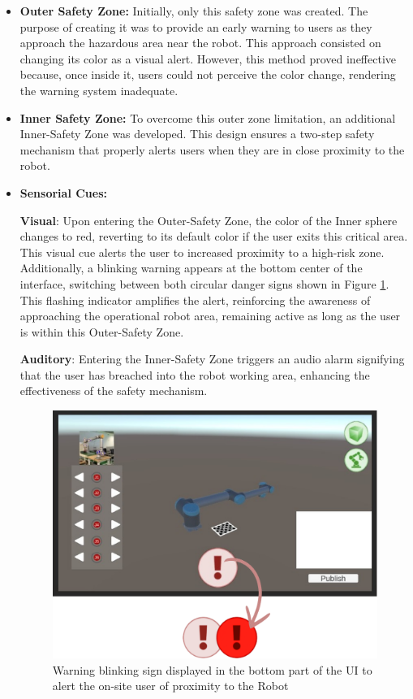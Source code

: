 \begin{itemize}
\item \textbf{Outer Safety Zone:} Initially, only this safety zone was created. The purpose of creating it was to provide an 
early warning to users as they approach the hazardous area near the robot. This approach consisted on changing its color as a visual alert. 
However, this method proved ineffective because, once inside it, users could not perceive the color change, rendering the warning system inadequate.

\item \textbf{Inner Safety Zone:} To overcome this outer zone limitation, an additional Inner-Safety Zone was developed. This design ensures a two-step safety mechanism that properly alerts users when they are in close proximity to the robot.

\item \textbf{Sensorial Cues:  }

\textbf{Visual}: Upon entering the Outer-Safety Zone, the color of the Inner sphere changes to red, reverting to its default color if the user exits this critical area. This visual cue alerts the user to increased proximity to a high-risk zone. Additionally, a blinking warning appears at the bottom center of the interface, switching between both circular danger signs shown in Figure \ref{fig:blinking-sign}. This flashing indicator amplifies the alert, reinforcing the awareness of approaching the operational robot area, remaining active as long as the user is within this Outer-Safety Zone.


\textbf{Auditory}: Entering the Inner-Safety Zone triggers an audio alarm signifying that the user has breached into the robot working area, enhancing the effectiveness of the safety mechanism.

\begin{figure}[h]
    \centering
    \includegraphics[width=0.7\linewidth]{figs/warning-sign.png}
    \caption{Warning blinking sign displayed in the bottom part of the \ac{UI} to alert the on-site user of proximity to the Robot}
    \label{fig:blinking-sign}
\end{figure}


\end{itemize}
